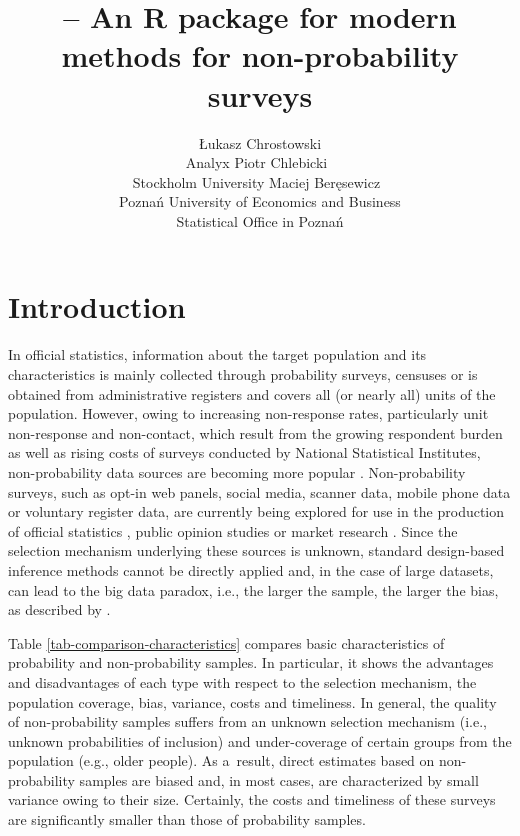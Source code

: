 \documentclass[nojss]{jss}
\author{
Łukasz Chrostowski\\Analyx \And Piotr
Chlebicki~\orcidlink{0009-0006-4867-7434}\\Stockholm University
\AND Maciej Beręsewicz~\orcidlink{0000-0002-8281-4301}\\Poznań
University of Economics and Business\\
Statistical Office in Poznań
}
\title{\pkg{nonprobsvy} -- An R package for modern methods for
non-probability surveys}
\begin{document}
\section{Introduction}\label{sec-introduction}

In official statistics, information about the target population and its
characteristics is mainly collected through probability surveys,
censuses or is obtained from administrative registers and covers all (or
nearly all) units of the population. However, owing to increasing
non-response rates, particularly unit non-response and non-contact,
which result from the growing respondent burden as well as rising costs
of surveys conducted by National Statistical Institutes, non-probability
data sources are becoming more popular
\citep{berkesewicz2017two, beaumont2020probability, biffignandi2021handbook}.
Non-probability surveys, such as opt-in web panels, social media,
scanner data, mobile phone data or voluntary register data, are
currently being explored for use in the production of official
statistics \citep{citro2014multiple, daas2015big}, public opinion
studies \citep{Schonlau2017} or market research \citep[cf.][]{Grow2022}.
Since the selection mechanism underlying these sources is unknown,
standard design-based inference methods cannot be directly applied and,
in the case of large datasets, can lead to the big data paradox, i.e.,
the larger the sample, the larger the bias, as described by
\citet{meng2018statistical}.

Table \ref{tab-comparison-characteristics} compares basic
characteristics of probability and non-probability samples. In
particular, it shows the advantages and disadvantages of each type with
respect to the selection mechanism, the population coverage, bias,
variance, costs and timeliness. In general, the quality of
non-probability samples suffers from an unknown selection mechanism
(i.e., unknown probabilities of inclusion) and under-coverage of certain
groups from the population (e.g., older people). As a~result, direct
estimates based on non-probability samples are biased and, in most
cases, are characterized by small variance owing to their size.
Certainly, the costs and timeliness of these surveys are significantly
smaller than those of probability samples.
\end{document}
